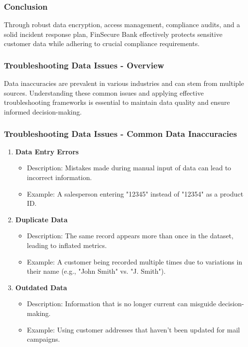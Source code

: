 \documentclass{beamer}
\begin{document}
\begin{frame}[fragile]
    \frametitle{Conclusion}
    Through robust data encryption, access management, compliance audits, and a solid incident response plan, FinSecure Bank effectively protects sensitive customer data while adhering to crucial compliance requirements.
\end{frame}

\begin{frame}[fragile]
    \frametitle{Troubleshooting Data Issues - Overview}
    Data inaccuracies are prevalent in various industries and can stem from multiple sources. 
    Understanding these common issues and applying effective troubleshooting frameworks is essential to maintain data quality and ensure informed decision-making.
\end{frame}

\begin{frame}[fragile]
    \frametitle{Troubleshooting Data Issues - Common Data Inaccuracies}
    \begin{enumerate}
        \item \textbf{Data Entry Errors}
        \begin{itemize}
            \item Description: Mistakes made during manual input of data can lead to incorrect information.
            \item Example: A salesperson entering "12345" instead of "12354" as a product ID.
        \end{itemize}
        
        \item \textbf{Duplicate Data}
        \begin{itemize}
            \item Description: The same record appears more than once in the dataset, leading to inflated metrics.
            \item Example: A customer being recorded multiple times due to variations in their name (e.g., "John Smith" vs. "J. Smith").
        \end{itemize}

        \item \textbf{Outdated Data}
        \begin{itemize}
            \item Description: Information that is no longer current can misguide decision-making.
            \item Example: Using customer addresses that haven't been updated for mail campaigns.
        \end{itemize}
    \end{enumerate}
\end{frame}
\end{document}
